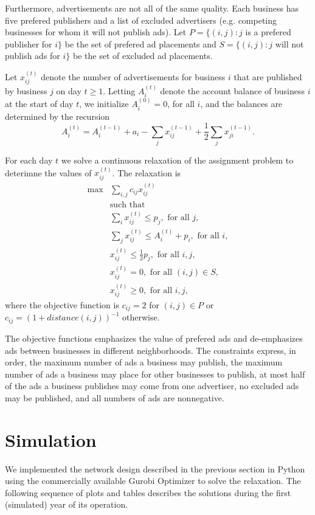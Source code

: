 \documentclass[letterpaper,10pt]{article}
\begin{document}
Furthermore, advertisements are not all of the same quality.  Each business has five prefered publishers and a list of excluded advertisers (e.g. competing businesses for whom it will not publish ads).  Let $P=\{(i,j): j$ is a prefered publisher for $i\}$ be the set of prefered ad placements and $S = \{(i,j): j$ will not publish ads for $i\}$ be the set of excluded ad placements.

Let $x_{ij}^{(t)}$ denote the number of advertisements for business $i$ that are published by business $j$ on day $t\geq1$.  Letting $A_{i}^{(t)}$ denote the account balance of business $i$ at the start of day $t$, we initialize $A_{i}^{(0)} = 0$, for all $i$, and the balances are determined by the recursion
\[A_{i}^{(t)} = A_{i}^{(t-1)} +a_i -\sum_{j}x_{ij}^{(t-1)} + \frac{1}{2}\sum_{j} x_{ji}^{(t-1)}.\]

For each day $t$ we solve a continuous relaxation of the assignment problem to deterimne the values of $x_{ij}^{(t)}$.  The relaxation is 
\begin{align*}
\max & \sum_{i,j} c_{ij}x_{ij}^{(t)}\\
&\text{such that}  \\
& \sum_{i} x_{ij}^{(t)} \leq p_j,\text{ for all }j,\\
& \sum_{j} x_{ij}^{(t)} \leq A_{i}^{(t)} + p_i,\text{ for all }i,\\
& x_{ij}^{(t)} \leq \frac{1}{2}p_j,\text{ for all }i,j,\\
& x_{ij}^{(t)} = 0,\text{ for all }(i,j)\in S,\\
&x_{ij}^{(t)}\geq0,\text{ for all }i,j,
\end{align*}
where the objective function is $c_{ij} = 2$ for $(i,j)\in P$ or $c_{ij}=(1+distance(i,j))^{-1}$ otherwise.

The objective functions emphasizes the value of prefered ads and de-emphasizes ads between businesses in different neighborhoods.  The constraints express, in order, the maximum number of ads a business may publish, the maximum number of ads a business may place for other businesses to publish, at most half of the ads a business publishes may come from one advertiser, no excluded ads may be published, and all numbers of ads are nonnegative.

\section{Simulation}
We implemented the network design described in the previous section in Python using the commercially available Gurobi Optimizer to solve the relaxation.  The following sequence of plots and tables describes the solutions during the first (simulated) year of its operation.
\end{document}
